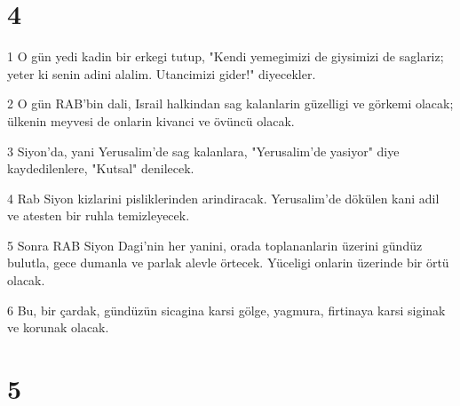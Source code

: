 \chapter{4}

\par 1 O gün yedi kadin bir erkegi tutup, "Kendi yemegimizi de giysimizi de saglariz; yeter ki senin adini alalim. Utancimizi gider!" diyecekler.
\par 2 O gün RAB'bin dali, Israil halkindan sag kalanlarin güzelligi ve görkemi olacak; ülkenin meyvesi de onlarin kivanci ve övüncü olacak.
\par 3 Siyon'da, yani Yerusalim'de sag kalanlara, "Yerusalim'de yasiyor" diye kaydedilenlere, "Kutsal" denilecek.
\par 4 Rab Siyon kizlarini pisliklerinden arindiracak. Yerusalim'de dökülen kani adil ve atesten bir ruhla temizleyecek.
\par 5 Sonra RAB Siyon Dagi'nin her yanini, orada toplananlarin üzerini gündüz bulutla, gece dumanla ve parlak alevle örtecek. Yüceligi onlarin üzerinde bir örtü olacak.
\par 6 Bu, bir çardak, gündüzün sicagina karsi gölge, yagmura, firtinaya karsi siginak ve korunak olacak.

\chapter{5}

